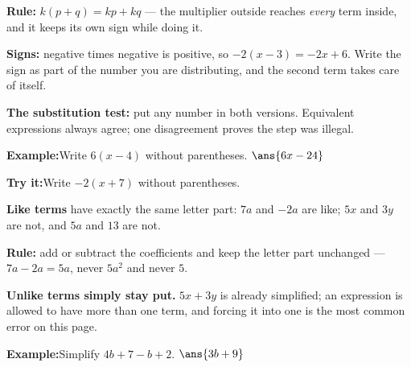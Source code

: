 \documentclass[12pt]{article}
\begin{document}


\begin{formulabox}
\textbf{Rule:} $k(p+q) = kp + kq$ --- the multiplier outside reaches
\emph{every} term inside, and it keeps its own sign while doing it.\par
\smallskip
\textbf{Signs:} negative times negative is positive, so
$-2(x-3) = -2x + 6$. Write the sign as part of the number you are
distributing, and the second term takes care of itself.\par
\smallskip
\textbf{The substitution test:} put any number in both versions. Equivalent
expressions always agree; one disagreement proves the step was illegal.
\end{formulabox}

\begin{examplebox}
\textbf{Example:}\quad Write $6(x-4)$ without parentheses.
$\ans{6x - 24}$
\end{examplebox}

\begin{tryitbox}
\textbf{Try it:}\quad Write $-2(x+7)$ without parentheses.\\[2pt]
\end{tryitbox}


\begin{formulabox}
\textbf{Like terms} have exactly the same letter part: $7a$ and $-2a$ are like;
$5x$ and $3y$ are not, and $5a$ and $13$ are not.\par
\smallskip
\textbf{Rule:} add or subtract the coefficients and keep the letter part
unchanged --- $7a - 2a = 5a$, never $5a^2$ and never $5$.\par
\smallskip
\textbf{Unlike terms simply stay put.} $5x+3y$ is already simplified; an
expression is allowed to have more than one term, and forcing it into one is the
most common error on this page.
\end{formulabox}

\begin{examplebox}
\textbf{Example:}\quad Simplify $4b + 7 - b + 2$.
$\ans{3b + 9}$
\end{examplebox}
\end{document}
